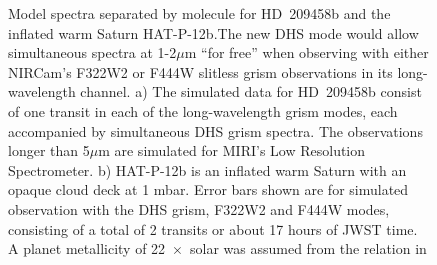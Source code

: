\documentclass[iop]{emulateapj}
\begin{document}
\begin{figure}[!thb]
\centering
{}
	\caption{Model spectra separated by molecule for HD~209458b and the inflated warm Saturn HAT-P-12b.The new DHS mode would allow simultaneous spectra at 1-2$\mu$m ``for free'' when observing with either NIRCam's F322W2 or F444W slitless grism observations in its long-wavelength channel. a) The simulated data for HD~209458b consist of one transit in each of the long-wavelength grism modes, each accompanied by simultaneous DHS grism spectra. The observations longer than 5$\mu$m are simulated for MIRI's Low Resolution Spectrometer. b) HAT-P-12b is an inflated warm Saturn with an opaque cloud deck at 1 mbar. Error bars shown are for simulated observation with the DHS grism, F322W2 and F444W modes, consisting of a total of 2 transits or about 17 hours of JWST time. A planet metallicity of 22~$\times$~solar was assumed from the relation in \citet{kreidberg2014wasp43}}
	\label{fig:spec}
\end{figure} 

\end{document}
